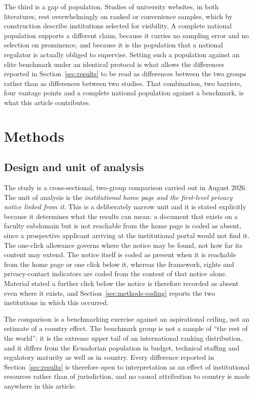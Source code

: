 \documentclass[]{interact}
\begin{document}
The third is a gap of population. Studies of university websites, in both literatures, rest overwhelmingly on ranked or convenience samples, which by construction describe institutions selected for visibility. A complete national population supports a different claim, because it carries no sampling error and no selection on prominence, and because it is the population that a national regulator is actually obliged to supervise. Setting such a population against an elite benchmark under an identical protocol is what allows the differences reported in Section~\ref{sec:results} to be read as differences between the two groups rather than as differences between two studies. That combination, two barriers, four vantage points and a complete national population against a benchmark, is what this article contributes.

\section{Methods}\label{sec:methods}

\subsection{Design and unit of analysis}\label{sec:methods-design}

The study is a cross-sectional, two-group comparison carried out in August 2026. The unit of analysis is the \emph{institutional home page and the first-level privacy notice linked from it}. This is a deliberately narrow unit and it is stated explicitly because it determines what the results can mean: a document that exists on a faculty subdomain but is not reachable from the home page is coded as absent, since a prospective applicant arriving at the institutional portal would not find it. The one-click allowance governs where the notice may be found, not how far its content may extend. The notice itself is coded as present when it is reachable from the home page or one click below it, whereas the framework, rights and privacy-contact indicators are coded from the content of that notice alone. Material stated a further click below the notice is therefore recorded as absent even where it exists, and Section~\ref{sec:methods-coding} reports the two institutions in which this occurred.

The comparison is a benchmarking exercise against an aspirational ceiling, not an estimate of a country effect. The benchmark group is not a sample of ``the rest of the world'': it is the extreme upper tail of an international ranking distribution, and it differs from the Ecuadorian population in budget, technical staffing and regulatory maturity as well as in country. Every difference reported in Section~\ref{sec:results} is therefore open to interpretation as an effect of institutional resources rather than of jurisdiction, and no causal attribution to country is made anywhere in this article.
\end{document}
